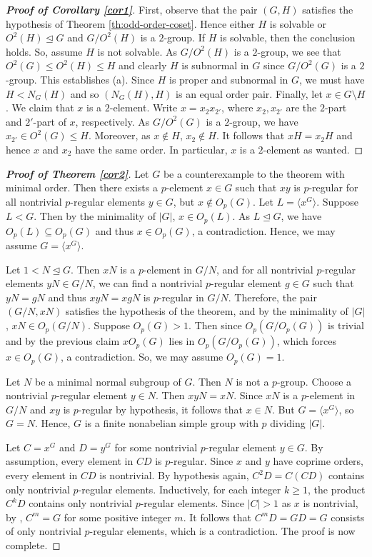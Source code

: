 \documentclass[twoside,a4paper,reqno,11pt]{amsart}
\newcommand{\<}{\langle}
\renewcommand{\>}{\rangle}
\newcommand{\la}{\langle}
\newcommand{\ra}{\rangle}
\newcommand{\leqs}{\leqslant}
\renewcommand{\leq}{\leqs}
\renewcommand{\:}{\colon}
\theoremstyle{definition}
\begin{document}
\begin{proof}[\textbf{Proof of Corollary \ref{cor1}}]
First, observe that the pair $(G,H)$ satisfies the hypothesis of Theorem \ref{th:odd-order-coset}. Hence either $H$ is solvable or $O^2(H)\unlhd G$ and $G/O^2(H)$ is a $2$-group. If $H$ is solvable, then the conclusion holds. So, assume $H$ is not solvable. As $G/O^2(H)$ is a $2$-group, we see that $O^2(G)\leq O^2(H)\leq H$ and clearly $H$ is subnormal in $G$ since $G/O^2(G)$ is a $2$-group. This establishes (a).  Since $H$ is proper and subnormal in $G$, we must have $H<N_G(H)$ and so $(N_G(H),H)$ is an equal order pair. Finally, let $x\in G\setminus H$. We claim that $x$ is a $2$-element. Write $x=x_2x_{2'}$, where $x_2,x_{2'}$ are the $2$-part and $2'$-part of $x$, respectively. As $G/O^2(G)$ is a $2$-group, we have $x_{2'}\in O^2(G)\leq H$. Moreover, as $x\not\in H$, $x_2\not\in H$.  It follows that $xH=x_2H$ and hence $x$ and $x_2$ have the same order. In particular, $x$ is a $2$-element as wanted.
\end{proof}



\begin{proof}[\textbf{Proof of Theorem \ref{cor2}}]
Let $G$ be a counterexample to the theorem with minimal order. Then there exists a $p$-element $x\in G$ such that $xy$ is  $p$-regular for all nontrivial $p$-regular elements $y\in G$, but $x\not\in O_p(G).$ 
Let $L=\la x^G\ra$. Suppose $L<G$. Then by the minimality of $|G|$, $x\in O_p(L)$.  As $L\unlhd G$,  we have $O_p(L)\subseteq O_p(G)$ and thus $x\in O_p(G)$,   a contradiction. Hence, we may assume $G=\la x^G\ra.$

Let $1<N\unlhd G$. Then $xN$ is a $p$-element in $G/N$, and for all nontrivial $p$-regular elements $yN\in G/N$, we can find a nontrivial $p$-regular element $g\in G$ such that $yN=gN$ and thus $xyN=xgN$ is  $p$-regular in $G/N$. Therefore,  the pair $(G/N,xN)$ satisfies the hypothesis of the theorem, and by the minimality of $|G|$, $xN\in O_p(G/N)$. 
Suppose $O_p(G)>1$. Then since $O_p(G/O_p(G))$ is trivial and by the previous claim $xO_p(G)$ lies in $O_p(G/O_p(G))$, which forces $x\in O_p(G)$, a contradiction. So, we may assume $O_p(G)=1$.  


Let $N$ be a minimal normal subgroup of $G$. Then $N$ is not a $p$-group. Choose a nontrivial $p$-regular element $y\in N$. Then $xyN=xN$. Since $xN$ is a $p$-element in $G/N$ and  $xy$ is  $p$-regular by hypothesis,  it follows that $x\in N$. But $G=\la x^G\ra$, so $G=N$. Hence, $G$ is a finite nonabelian simple group with $p$ dividing $|G|$. 

Let $C=x^G$ and $D=y^G$ for some nontrivial $p$-regular element $y\in G.$ By assumption, every element in $CD$ is $p$-regular. Since $x$ and $y$ have coprime orders, every element in $CD$ is nontrivial. By hypothesis again, $C^2D=C(CD)$ contains only nontrivial $p$-regular elements. Inductively, for each integer $k\ge 1$, the product $C^kD$ contains only nontrivial $p$-regular elements. Since $|C|>1$ as $x$ is nontrivial, by \cite[Theorem 1.1]{AH}, $C^m=G$ for some positive integer $m.$ It follows that $C^mD=GD=G$ consists of only nontrivial $p$-regular elements, which is a contradiction. The proof is now complete.
\end{proof}
\end{document}
